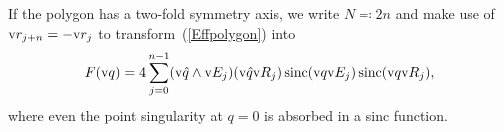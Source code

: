 If the polygon has a two-fold symmetry axis, we write $N\eqqcolon2n$
and make use of $\text{v}{r}_{j+n}=-\text{v}{r}_j$ to transform~(\ref{Effpolygon}) into
\begin{equation}\label{Effpolygon}
    F(\text{v}{q}) = \displaystyle 4 \sum_{j=0}^{n-1}
              (\text{v}{\hat q}\wedge\text{v}{E}_j) (\text{v}{\hat q}\text{v}{R}_j) \operatorname{sinc}(\text{v}{q}\text{v}{E}_j) \operatorname{sinc}(\text{v}{q}\text{v}{R}_j),
\end{equation}
where even the point singularity at $q=0$ is absorbed in a sinc function.

\iffalse
\section{Special functions near the removable singularity}

\index{Machine epsilon}
We assume a double-precision machine epsilon
of $\epsilon=2^{-52}\simeq2.2\cdot10^{-16}$.

\fi


